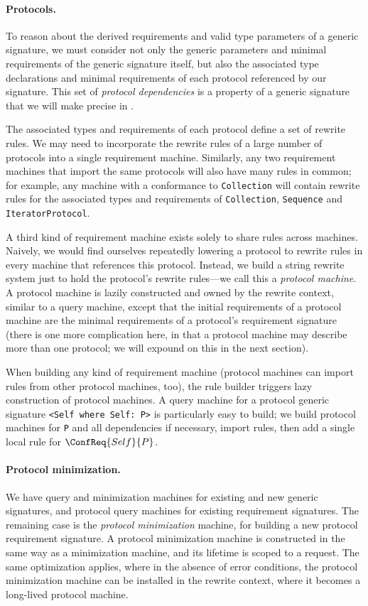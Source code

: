\documentclass[../generics]{subfiles}
\begin{document}
\paragraph{Protocols.}
To reason about the derived requirements and valid type parameters of a generic signature, we must consider not only the generic parameters and minimal requirements of the generic signature itself, but also the associated type declarations and minimal requirements of each protocol referenced by our signature. This set of \emph{protocol dependencies} is a property of a generic signature that we will make precise in .

The associated types and requirements of each protocol define a set of rewrite rules. We may need to incorporate the rewrite rules of a large number of protocols into a single requirement machine. Similarly, any two requirement machines that import the same protocols will also have many rules in common; for example, any machine with a conformance to \texttt{Collection} will contain rewrite rules for the associated types and requirements of \texttt{Collection}, \texttt{Sequence} and \texttt{IteratorProtocol}.

A third kind of requirement machine exists solely to share rules across machines. Naively, we would find ourselves repeatedly lowering a protocol to rewrite rules in every machine that references this protocol. Instead, we build a string rewrite system just to hold the protocol's rewrite rules---we call this a \emph{protocol machine}. A protocol machine is lazily constructed and owned by the rewrite context, similar to a query machine, except that the initial requirements of a protocol machine are the minimal requirements of a protocol's requirement signature (there is one more complication here, in that a protocol machine may describe more than one protocol; we will expound on this in the next section).

When building any kind of requirement machine (protocol machines can import rules from other protocol machines, too), the rule builder triggers lazy construction of protocol machines. A query machine for a protocol generic signature \verb|<Self where Self: P>| is particularly easy to build; we build protocol machines for \texttt{P} and all dependencies if necessary, import rules, then add a single local rule for $\ConfReq{Self}{P}$.

\paragraph{Protocol minimization.}
We have query and minimization machines for existing and new generic signatures, and protocol query machines for existing requirement signatures. The remaining case is the \emph{protocol minimization} machine, for building a new protocol requirement signature. A protocol minimization machine is constructed in the same way as a minimization machine, and its lifetime is scoped to a request. The same optimization applies, where in the absence of error conditions, the protocol minimization machine can be installed in the rewrite context, where it becomes a long-lived protocol machine.
\end{document}
